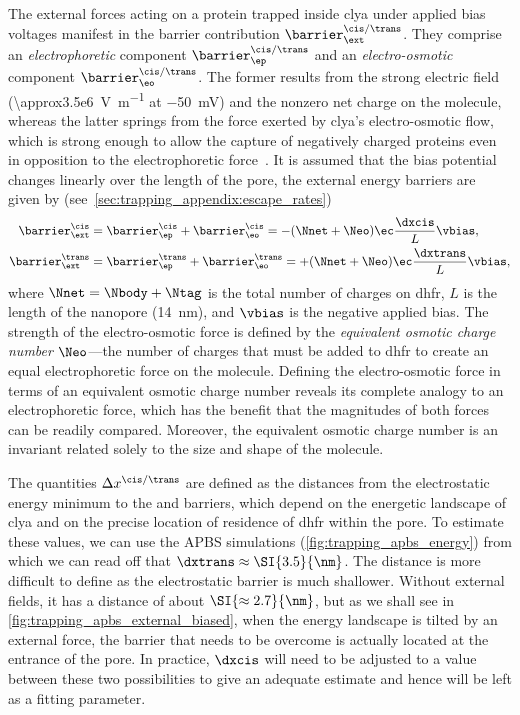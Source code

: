 The external forces acting on a protein trapped inside \gls{clya} under applied bias voltages manifest in the
barrier contribution $\barrier^{\cis/\trans}_\ext$. They comprise an \emph{electrophoretic} component
$\barrier^{\cis/\trans}_\ep$ and an \emph{electro-osmotic} component $\barrier^{\cis/\trans}_\eo$. The former
results from the strong electric field (\SI{\approx3.5e6}{\volt\per\meter} at \SI{-50}{\mV}) and the nonzero
net charge on the molecule, whereas the latter springs from the force exerted by \gls{clya}'s electro-osmotic
flow, which is strong enough to allow the capture of negatively charged proteins even in opposition to the
electrophoretic force~\cite{Soskine-2012,Soskine-2013,Soskine-Biesemans-2015,Biesemans-2015}. It is assumed
that the bias potential changes linearly over the length of the pore, the external energy barriers are given
by (see~\cref{sec:trapping_appendix:escape_rates})
%
\begin{subequations}\label{eq:external-barrier}
\begin{align}
  \barrier^{\cis}_\ext ={}&
    \barrier^{\cis}_\ep + \barrier^{\cis}_\eo =
    -(\Nnet + \Neo) \ec \dfrac{\dxcis}{L} \vbias,\\
  \barrier^{\trans}_\ext ={}&
    \barrier^{\trans}_\ep + \barrier^{\trans}_\eo =
    +(\Nnet + \Neo) \ec \dfrac{\dxtrans}{L} \vbias,
\end{align}
\end{subequations}
%
where $\Nnet = \Nbody + \Ntag$ is the total number of charges on \gls{dhfr}\@, $L$ is the length of the
nanopore (\SI{14}{\nm}), and $\vbias$ is the negative applied bias.  The strength of the electro-osmotic force
is defined by the \emph{equivalent osmotic charge number} $\Neo$---the number of charges that must be added to
\gls{dhfr} to create an equal electrophoretic force on the molecule. Defining the electro-osmotic force in
terms of an equivalent osmotic charge number reveals its complete analogy to an electrophoretic force, which
has the benefit that the magnitudes of both forces can be readily compared. Moreover, the equivalent osmotic
charge number is an invariant related solely to the size and shape of the molecule.

The quantities $\Delta x^{\cis/\trans}$ are defined as the distances from the electrostatic energy minimum to
the \cisi{} and \transi{} barriers, which depend on the energetic landscape of \gls{clya} and on the precise
location of residence of \gls{dhfr} within the pore. To estimate these values, we can use the APBS simulations
(\cref{fig:trapping_apbs_energy}) from which we can read off that $\dxtrans \approx \SI{3.5}{\nm}$. The
\cisi{} distance is more difficult to define as the \cisi{} electrostatic barrier is much shallower. Without
external fields, it has a distance of about $\SI{\approx2.7}{\nm}$, but as we shall see in
\cref{fig:trapping_apbs_external_biased}, when the energy landscape is tilted by an external force, the
barrier that needs to be overcome is actually located at the \cisi{} entrance of the pore. In practice,
$\dxcis$ will need to be adjusted to a value between these two possibilities to give an adequate estimate and
hence will be left as a fitting parameter.

